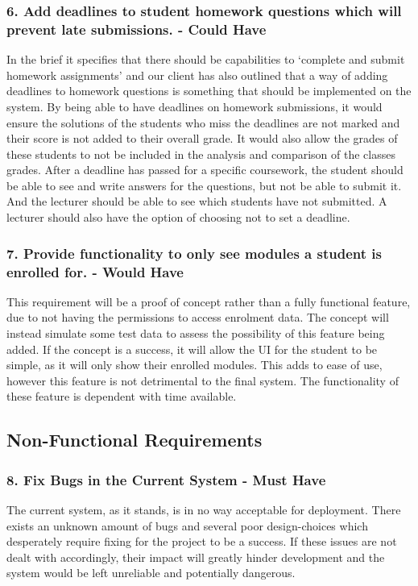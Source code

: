 	\subsubsection*{6. Add deadlines to student homework questions which will prevent late submissions. - Could Have}
	In the brief it specifies that there should be capabilities to ‘complete and submit homework assignments’ and our client has also outlined that a way of adding deadlines to homework questions is something that should be implemented on the system.
By being able to have deadlines on homework submissions, it would ensure the solutions of the students who miss the deadlines are not marked and their score is not added to their overall grade. It would also allow the grades of these students to not be included in the analysis and comparison of the classes grades.
After a deadline has passed for a specific coursework, the student should be able to see and write answers for the questions, but not be able to submit it.  And the lecturer should be able to see which students have not submitted.
A lecturer should also have the option of choosing not to set a deadline.

	\subsubsection*{7. Provide functionality to only see modules a student is enrolled for. - Would Have}
	This requirement will be a proof of concept rather than a fully functional feature, due to not having the permissions to access enrolment data. The concept will instead simulate some test data to assess the possibility of this feature being added. If the concept is a success, it will allow the UI for the student to be simple, as it will only show their enrolled modules. This adds to ease of use, however this feature is not detrimental to the final system. The functionality of these feature is dependent with time available.
	
	
	\subsection*{Non-Functional Requirements}
	\subsubsection*{8. Fix Bugs in the Current System - Must Have}
	The current system, as it stands, is in no way acceptable for deployment. There exists an unknown amount of bugs and several poor design-choices which desperately require fixing for the project to be a success. If these issues are not dealt with accordingly, their impact will greatly hinder development and the system would be left unreliable and potentially dangerous.

